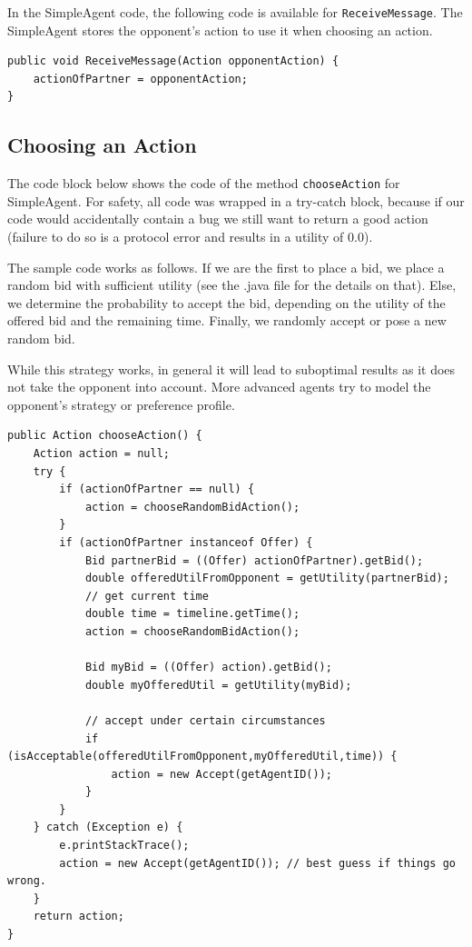 \documentclass[]{article}
\begin{document}
In the SimpleAgent code, the following code is available for \texttt{ReceiveMessage}. The SimpleAgent stores the opponent's action to use it when choosing an action.

\begin{lstlisting}
public void ReceiveMessage(Action opponentAction) {
	actionOfPartner = opponentAction;
}
\end{lstlisting}

\subsection{Choosing an Action}\label{sec:chooseAction}
The code block below shows the code of the method \texttt{chooseAction} for SimpleAgent. For safety, all code was wrapped in a try-catch block, because if our code would accidentally contain a bug we still want to return a good action (failure to do so is a protocol error and results in a utility of 0.0).

The sample code works as follows. If we are the first to place a bid, we place a random bid with sufficient utility (see the .java file for the details on that). Else, we determine the probability to accept the bid, depending on the utility of the offered bid and the remaining time. Finally, we randomly accept or pose a new random bid.

While this strategy works, in general it will lead to suboptimal results as it does not take the opponent into account. More advanced agents try to model the opponent's strategy or preference profile.

\begin{lstlisting}
public Action chooseAction() {
	Action action = null;
	try { 
		if (actionOfPartner == null) {
			action = chooseRandomBidAction();
		}
		if (actionOfPartner instanceof Offer) {
			Bid partnerBid = ((Offer) actionOfPartner).getBid();
			double offeredUtilFromOpponent = getUtility(partnerBid);
			// get current time
			double time = timeline.getTime();
			action = chooseRandomBidAction();
			
			Bid myBid = ((Offer) action).getBid();
			double myOfferedUtil = getUtility(myBid);
			
			// accept under certain circumstances
			if (isAcceptable(offeredUtilFromOpponent,myOfferedUtil,time)) {
				action = new Accept(getAgentID());
			}
		}
	} catch (Exception e) { 
		e.printStackTrace();
		action = new Accept(getAgentID()); // best guess if things go wrong. 
	}
	return action;
}
\end{lstlisting}
\end{document}
